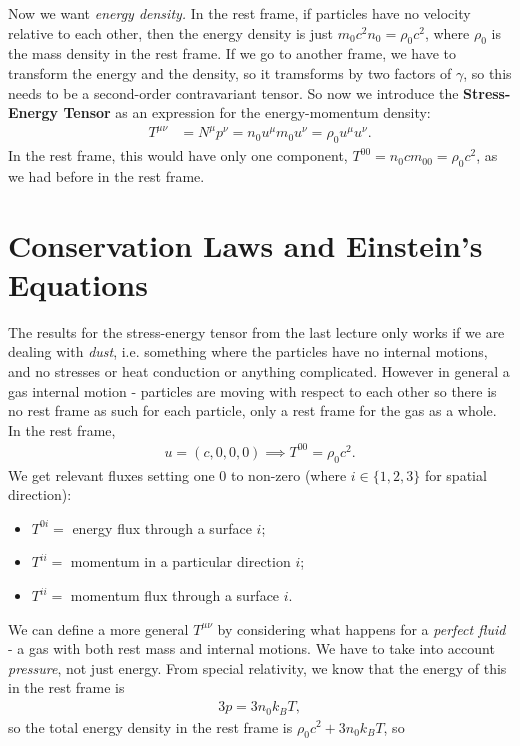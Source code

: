 \documentclass[a4paper, 11pt, normalem]{report}
\begin{document}
Now we want \emph{energy density.}
In the rest frame, if particles have no velocity relative to each other, then the energy density is just $m_0c^2n_0 = \rho_0c^2$, where $\rho_0$ is the mass density in the rest frame.
If we go to another frame, we have to transform the energy and the density, so it tramsforms by two factors of $\gamma$, so this needs to be a second-order contravariant tensor. 
So now we introduce the \textbf{Stress-Energy Tensor} as an expression for the energy-momentum density:
\begin{align}
    T^{\mu\nu} &= N^\mu p^\nu = n_0u^\mu m_0u^\nu = \rho_0 u^\mu u^\nu.
\end{align}
In the rest frame, this would have only one component, $T^{00}=n_0cm_00=\rho_0c^2$, as we had before in the rest frame.

\chapter{Conservation Laws and Einstein's Equations}
The results for the stress-energy tensor from the last lecture only works if we are dealing with \emph{dust}, i.e. something where the particles have no internal motions, and no stresses or heat conduction or anything complicated.
However in general a gas  internal motion - particles are moving with respect to each other so there is no rest frame as such for each particle, only a rest frame for the gas as a whole. 
In the rest frame, 
\begin{align}
    u = (c,0,0,0) \implies T^{00} = \rho_0c^2.
\end{align}
We get relevant fluxes setting one 0 to non-zero (where $i\in\{1,2,3\}$ for spatial direction):
\begin{itemize}
    \item $T^{0i} =$ energy flux through a surface $i$;
    \item $T^{ii} =$ momentum in a particular direction $i$;
    \item $T^{ii} =$ momentum flux through a surface $i$.
\end{itemize}
We can define a more general $T^{\mu\nu}$ by considering what happens for a \emph{perfect fluid} - a gas with both rest mass and internal motions. 
We have to take into account \emph{pressure}, not just energy.
From special relativity, we know that the energy of this in the rest frame is
\begin{align}
    3p = 3n_0k_BT,
\end{align}
so the total energy density in the rest frame is $\rho_0c^2 + 3n_0k_BT$, so
\end{document}
